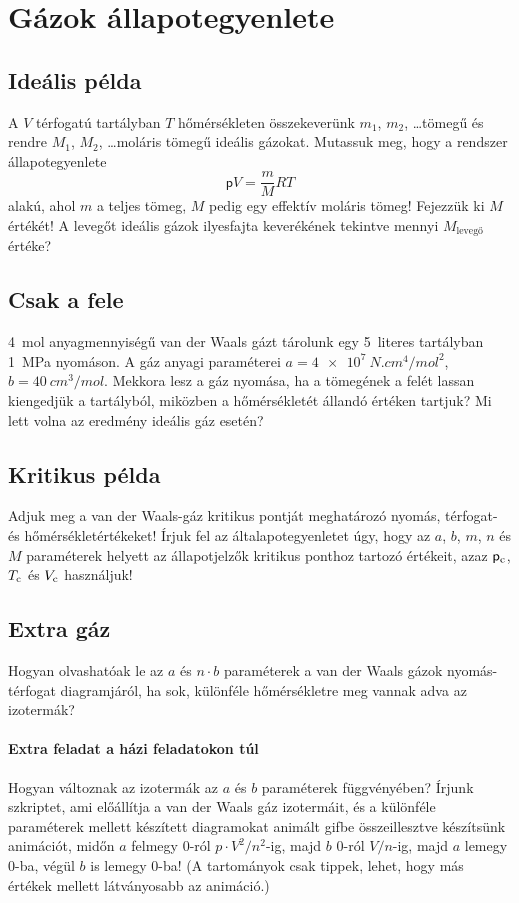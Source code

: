 \documentclass[12pt,a4paper]{scrartcl}
\newcommand{\pres}{\mathsf p}	%
\begin{document}
\section{Gázok állapotegyenlete}
\subsection{Ideális példa}
A $V$ térfogatú tartályban $T$ hőmérsékleten összekeverünk $m_1$, $m_2$, \ldots tömegű és rendre $M_1$, $M_2$, \ldots moláris tömegű ideális gázokat. Mutassuk meg, hogy a rendszer állapotegyenlete
\[\pres V = \frac{m}{M}RT\]
alakú, ahol $m$ a teljes tömeg, $M$ pedig egy effektív moláris tömeg! Fejezzük ki $M$ értékét! A levegőt ideális gázok ilyesfajta keverékének tekintve mennyi $M_{\text{levegő}}$ értéke?

\subsection{Csak a fele}
\SI{4}{mol}
 anyagmennyiségű van der Waals gázt tárolunk egy \SI{5}{literes}
  tartályban \SI{1}{MPa} nyomáson. A gáz anyagi paraméterei 
  $a=\SI{4e7}{N.cm^4/mol^2}$, 
  $b=\SI{40}{cm^3/mol}$. Mekkora lesz a gáz nyomása, ha a tömegének a felét lassan kiengedjük a tartályból, miközben a hőmérsékletét állandó értéken tartjuk? Mi lett volna az eredmény ideális gáz esetén?
  
\subsection{Kritikus példa}
Adjuk meg a van der Waals-gáz kritikus pontját meghatározó nyomás, térfogat- és hőmérsékletértékeket! Írjuk fel az általapotegyenletet úgy, hogy az $a$, $b$, $m$, $n$ és $M$ paraméterek helyett az állapotjelzők kritikus ponthoz tartozó értékeit, azaz $\pres_\text c$, $T_\text c$ és $V_\text c$ használjuk!

\subsection{Extra gáz}
Hogyan olvashatóak le az $a$ és $n \cdot b$ paraméterek a van der Waals gázok nyomás-térfogat diagramjáról, ha sok, különféle hőmérsékletre meg vannak adva az izotermák?

\paragraph{Extra feladat a házi feladatokon túl}
Hogyan változnak az izotermák az $a$ és $b$ paraméterek függvényében? Írjunk szkriptet, ami előállítja a van der Waals gáz izotermáit, és a különféle paraméterek mellett készített diagramokat animált gifbe összeillesztve készítsünk animációt, midőn $a$ felmegy 0-ról $p \cdot V^2/n^2$-ig, majd $b$ 0-ról $V/n$-ig, majd $a$ lemegy 0-ba, végül $b$ is lemegy $0$-ba! (A tartományok csak tippek, lehet, hogy más értékek mellett látványosabb az animáció.)
\end{document}
